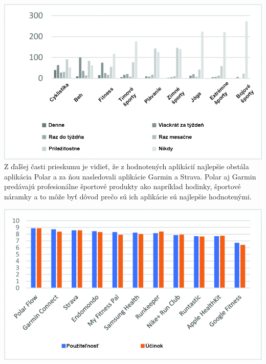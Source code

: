 \documentclass[10pt,twoside,slovak,a4paper]{article}
\begin{document}
\hfill \break
\includegraphics[scale =0.4]{obrazok3.png}
\hfill \break
\label{Výsledok aplikácie}
Z ďaľšej časti prieskumu je vidieť, že z hodnotených aplikácií najlepšie obstála aplikácia Polar a za ňou nasledovali aplikácie Garmin a Strava. Polar aj Garmin predávajú profesionálne športové produkty ako napríklad hodinky, športové náramky a to môže byť dôvod prečo sú ich aplikácie sú najlepšie hodnotenými.

\hfill \break
\includegraphics[scale =0.5]{obrazok1.png}
\end{document}
